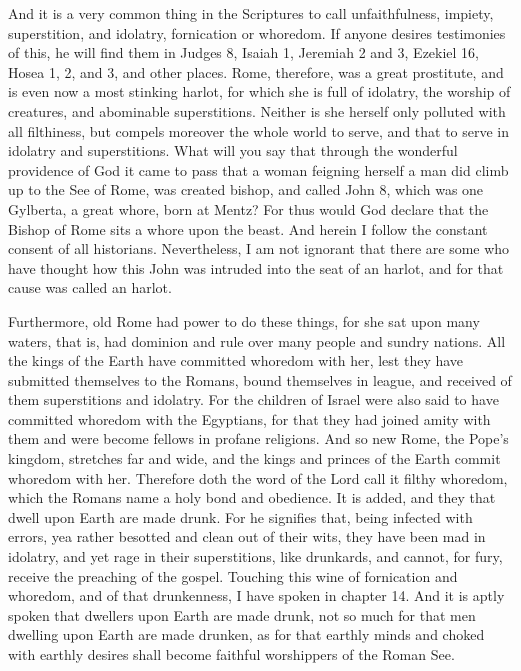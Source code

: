 And it is a very common thing in the Scriptures to call unfaithfulness, impiety, superstition, and idolatry, fornication or whoredom. If anyone desires testimonies of this, he will find them in Judges 8, Isaiah 1, Jeremiah 2 and 3, Ezekiel 16, Hosea 1, 2, and 3, and other places. Rome, therefore, was a great prostitute, and is even now a most stinking harlot, for which she is full of idolatry, the worship of creatures, and abominable superstitions. Neither is she herself only polluted with all filthiness, but compels moreover the whole world to serve, and that to serve in idolatry and superstitions. What will you say that through the wonderful providence of God it came to pass that a woman feigning herself a man did climb up to the See of Rome, was created bishop, and called John 8, which was one Gylberta, a great whore, born at Mentz? For thus would God declare that the Bishop of Rome sits a whore upon the beast. And herein I follow the constant consent of all historians. Nevertheless, I am not ignorant that there are some who have thought how this John was intruded into the seat of an harlot, and for that cause was called an harlot.

Furthermore, old Rome had power to do these things, for she sat upon many waters, that is, had dominion and rule over many people and sundry nations. All the kings of the Earth have committed whoredom with her, lest they have submitted themselves to the Romans, bound themselves in league, and received of them superstitions and idolatry. For the children of Israel were also said to have committed whoredom with the Egyptians, for that they had joined amity with them and were become fellows in profane religions. And so new Rome, the Pope’s kingdom, stretches far and wide, and the kings and princes of the Earth commit whoredom with her. Therefore doth the word of the Lord call it filthy whoredom, which the Romans name a holy bond and obedience. It is added, and they that dwell upon Earth are made drunk. For he signifies that, being infected with errors, yea rather besotted and clean out of their wits, they have been mad in idolatry, and yet rage in their superstitions, like drunkards, and cannot, for fury, receive the preaching of the gospel. Touching this wine of fornication and whoredom, and of that drunkenness, I have spoken in chapter 14. And it is aptly spoken that dwellers upon Earth are made drunk, not so much for that men dwelling upon Earth are made drunken, as for that earthly minds and choked with earthly desires shall become faithful worshippers of the Roman See.

